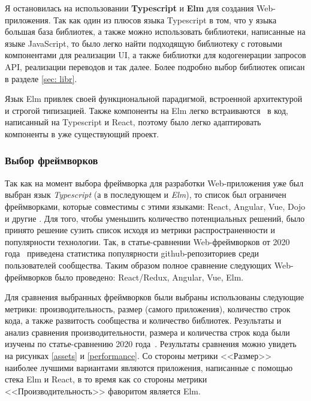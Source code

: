 \documentclass[a4paper,12pt,reqno]{article}
\begin{document}
Я остановилась на использовании \textbf{Typescript} и \textbf{Elm} для создания Web-приложения. Так как один из плюсов языка Typescript в том, что у языка большая база библиотек, а также можно использовать библиотеки, написанные на языке JavaScript, то было легко найти подходящую библиотеку с готовыми компонентами для реализации UI, а также библиотки для кодогенерации запросов API, реализации переводов и так далее. Более подробно выбор библиотек описан в разделе \ref{sec: libr}. 

Язык Elm привлек своей функциональной парадигмой, встроенной архитектурой и строгой типизацией. Также компоненты на Elm легко встраиваются~\cite{elm-ports} в код, написанный на Typescript и React, поэтому было легко адаптировать компоненты в уже существующий проект.


\subsubsection{Выбор фреймворков}


Так как на момент выбора фреймворка для разработки Web-приложения уже был выбран язык \textit{Typescript} (а в последующем и \textit{Elm}), то список был ограничен фреймворками, которые совместимы с этими языками: React, Angular, Vue, Dojo и другие \cite{ts-frameworks}. Для того, чтобы уменьшить количество потенциальных решений, было принято решение сузить список исходя из метрики распространенности и популярности технологии. Так, в статье-сравнении Web-фреймворков от 2020 года~\cite{realworld} приведена статистика популярности github-репозиториев среди пользователей сообщества. Таким образом полное сравнение следующих Web-фреймворков было проведено: React/Redux, Angular, Vue, Elm.

Для сравнения выбранных фреймворков были выбраны использованы следующие метрики: производительность, размер (самого приложения), количество строк кода, а также развитость сообщества и количество библиотек. Результаты и анализ сравнения производительности, размера и количества строк кода были изучены по статье-сравнению 2020 года~\cite{realworld}. Результаты сравнения можно увидеть на рисунках \ref{assets} и \ref{performance}. Со стороны метрики <<Размер>> наиболее лучшими вариантами являются приложения, написанные с помощью стека Elm и React, в то время как со стороны метрики <<Производительность>> фаворитом является Elm. 
\end{document}
